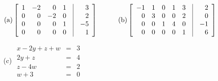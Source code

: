 \begin{enumerate}
$\rm{(a)} \left [ \begin{array}{rrrrcr}
                    1&-2&0&1&\vline&3\\
                    0&0&-2&0&\vline&2\\
                    0&0&0&1&\vline&-5\\
                    0&0&0&0&\vline&1 \end{array} \right ] \quad
                    \quad \quad
\rm{(b)} \left [ \begin{array}{rrrrrcr}
                    -1&1&0&1&3&\vline&2\\
                    0&3&0&0&2&\vline&0\\
                    0&0&1&4&0&\vline&-1\\
                    0&0&0&0&1&\vline&6 \end{array} \right ]$

(c) $ \begin{array}{rrr} x-2y+z+w&=&3\\ 2y+z&=&4\\ z-4w&=&2\\
w+3&=&0 \end{array}$


\end{enumerate}
